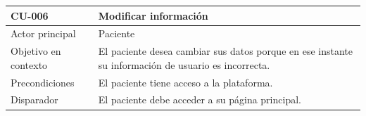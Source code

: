
\begin{table}[htpb]
\centering
\begin{tabularx}{\textwidth}{|X|X|}
\hline
\rowcolor[gray]{0.9}\textbf{CU-006}                            & \textbf{Modificar información}                                                                                                                                                                                                                                                                                                                                                                                                                                                                                \\ \hline
Actor principal                   & Paciente                                                                                                                                                                                                                                                                                                                                                                                                                                                                                             \\ \hline
Objetivo en contexto              & El paciente desea cambiar sus datos porque en ese instante su información de usuario es incorrecta.                                                                                                                                                                                                                                                                                                                                                                                                   \\ \hline
Precondiciones                    & El paciente tiene acceso a la plataforma.                                                                                                                                                                                                                                                                                                                                                                                                                                                             \\ \hline
Disparador                        & El paciente debe acceder a su página principal.                                                                                                                                                                                                                                                                                                                                                                                                                                                       \\ \hline

\end{tabularx}
\end{table}
